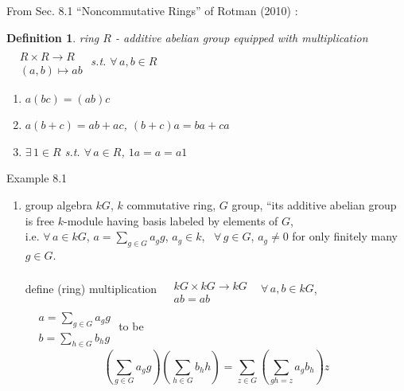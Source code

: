 \documentclass[10pt]{amsart}
\newtheorem{definition}{Definition}
\begin{document}
\begin{multicols*}{2}
From Sec. 8.1 ``Noncommutative Rings'' of Rotman (2010) \cite{JRotman2010}:

\begin{definition}
  ring $R$ - additive abelian group equipped with multiplication $\begin{aligned} & \quad \\ 
& R \times R \to R \\
    & (a,b) \mapsto ab \end{aligned}$ s.t. $\forall \, a ,b \in R$

\begin{enumerate}
\item[(i)] $a(bc) = (ab)c$ 
\item[(ii)] $a(b+c) = ab+ ac$, $(b+c)a = ba + ca$ 
\item[(iii)] $\exists \, 1 \in R$ s.t. $\forall \, a \in R$, $1a = a = a1$
\end{enumerate}
\end{definition}

Example 8.1\cite{JRotman2010}
\begin{enumerate}
\item[(ii)] group algebra $kG$, $k$ commutative ring, $G$ group, ``its additive abelian group is free $k$-module having basis labeled by elements of $G$, \\
i.e. $\forall \, a \in kG$, $a = \sum_{g\in G} a_g g$, $a_g \in k$, \, $\forall \, g \in G$, $a_g \neq 0$ for only finitely many $g\in G$.  

define (ring) multiplication $\begin{aligned} & \quad \\ 
  & kG \times kG \to kG \\
  & ab = ab \end{aligned}$ \, $\forall \, a,b \in kG$, $\begin{aligned} & \quad \\ 
  & a = \sum_{g\in G} a_g g \\
  & b = \sum_{h \in G} b_h g \end{aligned}$ to be 
\[
\left( \sum_{g \in G} a_g g \right) \left( \sum_{h \in G} b_h h \right) = \sum_{ z\in G} \left( \sum_{ gh = z} a_g b_h \right)z
\]

\end{enumerate}


\end{multicols*}
\end{document}
